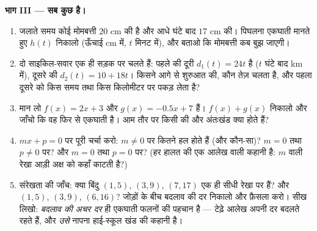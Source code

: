 \begin{problem}
\medskip
\noindent\textbf{भाग III --- सब कुछ  है।}
\begin{enumerate}[resume]
  \item जलाते समय कोई मोमबत्ती $20$ cm की है और आधे घंटे बाद $17$
        cm की। पिघलना एकघाती मानते हुए $h(t)$ निकालो (ऊँचाई cm में,
        $t$ मिनट में), और बताओ कि मोमबत्ती कब बुझ जाएगी।
  \item दो साइकिल-सवार एक ही सड़क पर चलते हैं: पहले की दूरी
        $d_1(t) = 24t$ है ($t$ घंटे बाद km में), दूसरे की
        $d_2(t) = 10 + 18t$। किसने आगे से शुरुआत की, कौन तेज़ चलता
        है, और पहला दूसरे को किस समय तथा किस किलोमीटर पर पकड़ लेता
        है?
  \item मान लो $f(x) = 2x + 3$ और $g(x) = -0.5x + 7$ हैं।
        $f(x) + g(x)$ निकालो और जाँचो कि वह फिर से एकघाती है। आम
        तौर पर किसी  की  और अंतःखंड क्या होते हैं?
  \item {} $mx + p = 0$ पर पूरी चर्चा करो: $m \neq 0$ पर कितने
        हल होते हैं (और कौन-सा)? $m = 0$ तथा $p \neq 0$ पर? और
        $m = 0$ तथा $p = 0$ पर? (हर हालत की एक आलेख वाली कहानी है:
         $m$ वाली रेखा आड़ी अक्ष को कहाँ काटती है?)
  \item संरेखता की जाँच: क्या बिंदु $(1, 5)$, $(3, 9)$, $(7, 17)$
        एक ही सीधी रेखा पर हैं? और $(1, 5)$, $(3, 9)$, $(6, 16)$?
        जोड़ों के बीच बदलाव की दर निकालो और फ़ैसला करो। सीख लिखो:
        \emph{बदलाव की अचर दर} ही एकघाती फलनों की पहचान है ---
        टेढ़े आलेख अपनी दर बदलते रहते हैं, और \emph{उसे} नापना
        हाई-स्कूल खंड की कहानी है।

\end{enumerate}
\end{problem}

